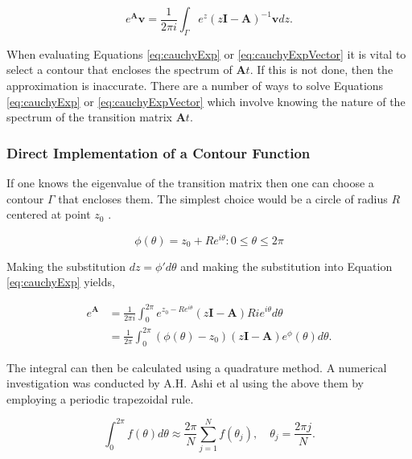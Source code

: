 \begin{equation}
	e^{\boldsymbol{A}}\boldsymbol{v} = \frac{1}{2\pi i}\int_{\Gamma} e^{z}(z\boldsymbol{I} - \boldsymbol{A})^{-1}\boldsymbol{v}dz.
	\label{eq:cauchyExpVector}
\end{equation}

\noindent When evaluating Equations \ref{eq:cauchyExp} or \ref{eq:cauchyExpVector} it is vital to select a contour that encloses the spectrum of $\boldsymbol{A}t$. If this is not done, then the approximation is inaccurate. There are a number of ways to solve Equations \ref{eq:cauchyExp} or \ref{eq:cauchyExpVector} which involve knowing the nature of the spectrum of the transition matrix $\boldsymbol{A}t$. 

\subsubsection{Direct Implementation of a Contour Function}
If one knows the eigenvalue of the transition matrix then one can choose a contour $\Gamma$ that encloses them. The simplest choice would be a circle of radius $R$ centered at point $z_{0}$ \cite{ash2009}.

\begin{equation}
    \phi(\theta) = z_{0} + Re^{i\theta}: 0 \leq \theta \leq 2\pi 
\end{equation}

\noindent Making the substitution $dz = \phi' d\theta$ and making the substitution into Equation \ref{eq:cauchyExp} yields,

\begin{equation}
\begin{split}
    e^{\boldsymbol{A}} 
    & = \frac{1}{2\pi i}\int_{0}^{2\pi} e^{z_{0}-Re^{i\theta}}(z\boldsymbol{I}-\boldsymbol{A})Rie^{i\theta}d\theta \\[3ex]
    & = \frac{1}{2\pi}\int_{0}^{2\pi}(\phi(\theta)-z_{0})(z\boldsymbol{I}-\boldsymbol{A})e^\phi(\theta)d\theta.
\end{split}
\end{equation}

\noindent The integral can then be calculated using a quadrature method. A numerical investigation was conducted by A.H. Ashi et al \cite{ash2009} using the above them by employing a periodic trapezoidal rule. 

\begin{equation*}
    \int_{0}^{2\pi}f(\theta)d\theta \approx \frac{2\pi}{N}\sum_{j=1}^{N}f(\theta_{j}), \quad \theta_{j} = \frac{2\pi j}{N}.
\end{equation*}

